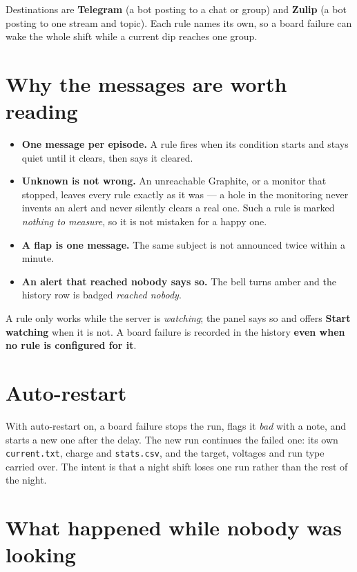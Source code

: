 \documentclass[11pt,a4paper]{report}
\newcommand{\ui}[1]{\textbf{#1}}          %
\newcommand{\file}[1]{\texttt{#1}}
\begin{document}
Destinations are \textbf{Telegram} (a bot posting to a chat or group) and
\textbf{Zulip} (a bot posting to one stream and topic). Each rule names its own,
so a board failure can wake the whole shift while a current dip reaches one group.

\section{Why the messages are worth reading}

\begin{itemize}
  \item \textbf{One message per episode.} A rule fires when its condition starts
        and stays quiet until it clears, then says it cleared.
  \item \textbf{Unknown is not wrong.} An unreachable Graphite, or a monitor that
        stopped, leaves every rule exactly as it was --- a hole in the monitoring
        never invents an alert and never silently clears a real one. Such a rule
        is marked \emph{nothing to measure}, so it is not mistaken for a happy
        one.
  \item \textbf{A flap is one message.} The same subject is not announced twice
        within a minute.
  \item \textbf{An alert that reached nobody says so.} The bell turns amber and
        the history row is badged \emph{reached nobody}.
\end{itemize}

A rule only works while the server is \emph{watching}; the panel says so and
offers \ui{Start watching} when it is not. A board failure is recorded in the
history \textbf{even when no rule is configured for it}.

\section{Auto-restart}

With auto-restart on, a board failure stops the run, flags it \emph{bad} with a
note, and starts a new one after the delay. The new run continues the failed one:
its own \file{current.txt}, charge and \file{stats.csv}, and the target, voltages
and run type carried over. The intent is that a night shift loses one run rather
than the rest of the night.

\section{What happened while nobody was looking}
\end{document}
